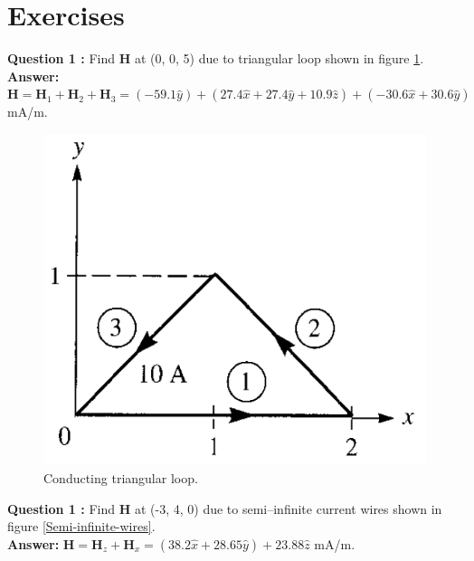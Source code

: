 \documentclass[12pt,a4paper]{article}
\begin{document}
\section{Exercises}
\noindent\textbf{Question 1 \cite[Example 7.1, page 266]{Sadiku}:} Find \textbf{H} at (0, 0, 5) due to triangular loop shown in figure \ref{Conducting-triangular-loop}.\\
\textbf{Answer: }$\textbf{H}=\textbf{H}_1+\textbf{H}_2+\textbf{H}_3=(-59.1\hat y)+(27.4\hat x+27.4\hat y+10.9\hat z)+(-30.6\hat x+30.6\hat y)$ mA/m.
\begin{figure}[H]
\centering
\includegraphics[scale=0.45]{Figure7-6aS.png}
\caption{Conducting triangular loop.}
\label{Conducting-triangular-loop}
\end{figure}
\noindent\textbf{Question 1 \cite[Example 7.1, page 266]{Sadiku}:} Find \textbf{H} at (-3, 4, 0) due to semi--infinite current wires shown in figure \ref{Semi-infinite-wires}.\\
\textbf{Answer: }$\textbf{H}=\textbf{H}_z+\textbf{H}_x=(38.2\hat x+28.65\hat y)+23.88\hat z$ mA/m.
\end{document}
